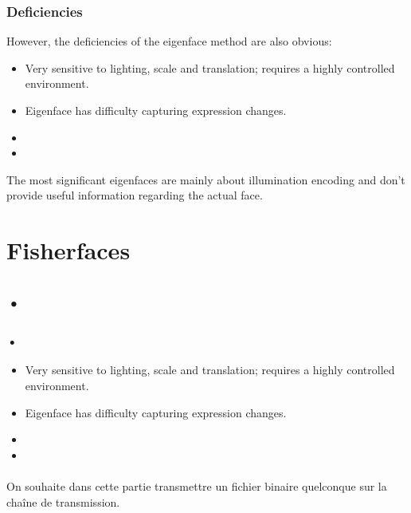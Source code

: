 \subsubsection{Deficiencies}
However, the deficiencies of the eigenface method are also obvious:
\begin{itemize}
\item Very sensitive to lighting, scale and translation; requires a highly controlled environment.
\item Eigenface has difficulty capturing expression changes.
\item 
\item 
\end{itemize}

The most significant eigenfaces are mainly about illumination encoding and don't provide useful information regarding the actual face.






\section{Fisherfaces}
\subsection{•}
\subsubsection{•}
\begin{itemize}
\item Very sensitive to lighting, scale and translation; requires a highly controlled environment.
\item Eigenface has difficulty capturing expression changes.
\item 
\item 
\end{itemize}











\paragraph{} On souhaite dans cette partie transmettre un fichier binaire quelconque sur la chaîne de transmission.

